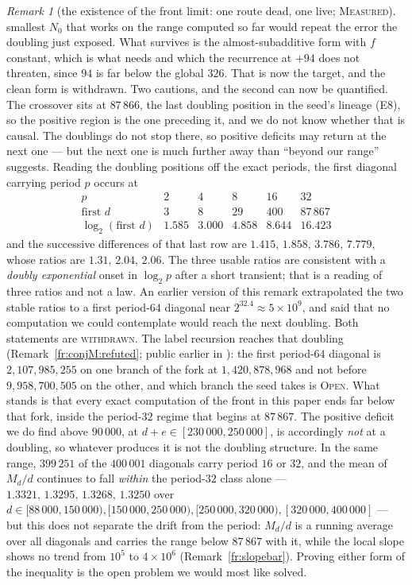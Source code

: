 \documentclass[11pt]{article}
\theoremstyle{definition}
\theoremstyle{remark}
\newtheorem{remark}[theorem]{Remark}
\newcommand{\MEASURED}{\textsc{Measured}}
\newcommand{\OPEN}{\textsc{Open}}
\begin{document}
\begin{remark}[the existence of the front limit: one route dead, one live; \MEASURED]
smallest $N_0$ that works on the range computed so far would repeat the error the doubling just exposed.
What survives is the almost-subadditive form with $f$ constant, which is what \cite{FR} needs and which
the recurrence at $+94$ does not threaten, since $94$ is far below the global $326$. That is now the
target, and the clean form is withdrawn. Two cautions, and the second can now be quantified. The crossover
sits at $87\,866$, the last doubling position in the seed's lineage (E8), so the positive region is the
one preceding it, and we do not know whether that is causal. The doublings do not stop there, so
positive deficits may return at the next one --- but the next one is much further away than ``beyond our
range'' suggests. Reading the doubling positions off the exact periods, the first diagonal carrying
period $p$ occurs at
\[
\begin{array}{lrrrrr}
p & 2 & 4 & 8 & 16 & 32\\
\text{first } d & 3 & 8 & 29 & 400 & 87\,867\\
\log_2(\text{first }d) & 1.585 & 3.000 & 4.858 & 8.644 & 16.423
\end{array}
\]
and the successive differences of that last row are $1.415,\,1.858,\,3.786,\,7.779$, whose ratios are
$1.31,\,2.04,\,2.06$. The three usable ratios are consistent with a \emph{doubly exponential} onset in $\log_2 p$ after a short
transient; that is a reading of three ratios and not a law. An earlier version of this remark extrapolated the two stable ratios to a first period-$64$ diagonal near
$2^{32.4}\approx5\times10^{9}$, and said that no computation we could contemplate would reach the next doubling. Both statements are \textsc{withdrawn}.
The label recursion reaches that doubling (Remark~\ref{fr:conjM:refuted}; public earlier in \cite{Dib,Pat}): the first period-$64$ diagonal is $2{,}107{,}985{,}255$ on one branch of the fork at $1{,}420{,}878{,}968$ and not before $9{,}958{,}700{,}505$ on the other, and which branch the seed takes is \OPEN. What stands is that
every exact computation of the front in this paper ends far below that fork, inside the
period-$32$ regime that begins at $87\,867$. The positive deficit we do find above $90\,000$, at $d+e\in[230\,000,250\,000]$, is
accordingly \emph{not} at a doubling, so whatever produces it is not the doubling structure. In the same range,
$399\,251$ of the $400\,001$ diagonals carry period $16$ or $32$, and the mean of $M_d/d$ continues to
fall \emph{within} the period-$32$ class alone --- $1.3321,\,1.3295,\,1.3268,\,1.3250$ over
$d\in[88\,000,150\,000),[150\,000,250\,000),[250\,000,320\,000),[320\,000,400\,000]$ --- but this does not
separate the drift from the period: $M_d/d$ is a running average over all diagonals and carries the range below $87\,867$
with it, while the local slope shows no trend from $10^{5}$ to $4\times10^{6}$ (Remark~\ref{fr:slopebar}). Proving either form of the inequality is the open problem we
would most like solved.


\end{remark}
\end{document}
